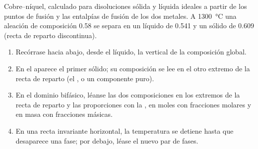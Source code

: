 \begin{omfigure}

{\small Cobre--níquel, calculado para disoluciones sólida y líquida ideales a partir de los
puntos de fusión y las entalpías de fusión de los dos metales. A
\qty{1300}{\degreeCelsius} una aleación de composición 0.58 se separa en un líquido
de 0.541 y un sólido de 0.609 (recta de reparto discontinua).}
\end{omfigure}

\begin{method}\label{met:b2:solid-liquid-diagrams:read-solid-liquid}
\begin{enumerate}
  \item Recórrase hacia abajo, desde el líquido, la vertical de la composición
        global.
  \item En el  aparece el primer sólido; su composición se lee en
        el otro extremo de la recta de reparto (el , o un componente puro).
  \item En el dominio bifásico, léanse las dos composiciones en los extremos de la
        recta de reparto y las proporciones con la , en moles con fracciones
        molares y en masa con fracciones másicas.
  \item En una recta invariante horizontal, la temperatura se detiene hasta que desaparece una fase;
        por debajo, léase el nuevo par de fases.
\end{enumerate}
\end{method}


